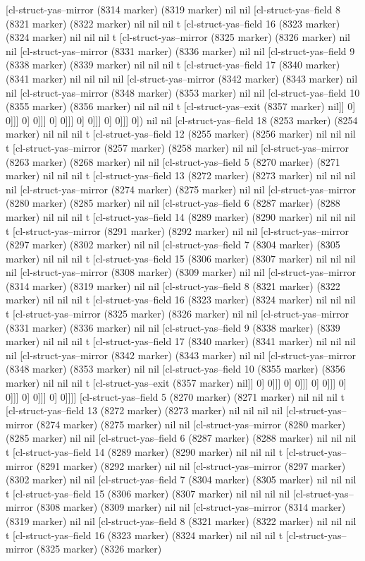 {{[cl-struct-yas--mirror (8314 marker) (8319 marker) nil nil [cl-struct-yas--field 8 (8321 marker) (8322 marker) nil nil nil t [cl-struct-yas--field 16 (8323 marker) (8324 marker) nil nil nil t [cl-struct-yas--mirror (8325 marker) (8326 marker) nil nil [cl-struct-yas--mirror (8331 marker) (8336 marker) nil nil [cl-struct-yas--field 9 (8338 marker) (8339 marker) nil nil nil t [cl-struct-yas--field 17 (8340 marker) (8341 marker) nil nil nil nil [cl-struct-yas--mirror (8342 marker) (8343 marker) nil nil [cl-struct-yas--mirror (8348 marker) (8353 marker) nil nil [cl-struct-yas--field 10 (8355 marker) (8356 marker) nil nil nil t [cl-struct-yas--exit (8357 marker) nil]] 0] 0]]] 0] 0]]] 0] 0]]] 0] 0]]] 0] 0]]] 0]) nil nil [cl-struct-yas--field 18 (8253 marker) (8254 marker) nil nil nil t [cl-struct-yas--field 12 (8255 marker) (8256 marker) nil nil nil t [cl-struct-yas--mirror (8257 marker) (8258 marker) nil nil [cl-struct-yas--mirror (8263 marker) (8268 marker) nil nil [cl-struct-yas--field 5 (8270 marker) (8271 marker) nil nil nil t [cl-struct-yas--field 13 (8272 marker) (8273 marker) nil nil nil nil [cl-struct-yas--mirror (8274 marker) (8275 marker) nil nil [cl-struct-yas--mirror (8280 marker) (8285 marker) nil nil [cl-struct-yas--field 6 (8287 marker) (8288 marker) nil nil nil t [cl-struct-yas--field 14 (8289 marker) (8290 marker) nil nil nil t [cl-struct-yas--mirror (8291 marker) (8292 marker) nil nil [cl-struct-yas--mirror (8297 marker) (8302 marker) nil nil [cl-struct-yas--field 7 (8304 marker) (8305 marker) nil nil nil t [cl-struct-yas--field 15 (8306 marker) (8307 marker) nil nil nil nil [cl-struct-yas--mirror (8308 marker) (8309 marker) nil nil [cl-struct-yas--mirror (8314 marker) (8319 marker) nil nil [cl-struct-yas--field 8 (8321 marker) (8322 marker) nil nil nil t [cl-struct-yas--field 16 (8323 marker) (8324 marker) nil nil nil t [cl-struct-yas--mirror (8325 marker) (8326 marker) nil nil [cl-struct-yas--mirror (8331 marker) (8336 marker) nil nil [cl-struct-yas--field 9 (8338 marker) (8339 marker) nil nil nil t [cl-struct-yas--field 17 (8340 marker) (8341 marker) nil nil nil nil [cl-struct-yas--mirror (8342 marker) (8343 marker) nil nil [cl-struct-yas--mirror (8348 marker) (8353 marker) nil nil [cl-struct-yas--field 10 (8355 marker) (8356 marker) nil nil nil t [cl-struct-yas--exit (8357 marker) nil]] 0] 0]]] 0] 0]]] 0] 0]]] 0] 0]]] 0] 0]]] 0] 0]]]] [cl-struct-yas--field 5 (8270 marker) (8271 marker) nil nil nil t [cl-struct-yas--field 13 (8272 marker) (8273 marker) nil nil nil nil [cl-struct-yas--mirror (8274 marker) (8275 marker) nil nil [cl-struct-yas--mirror (8280 marker) (8285 marker) nil nil [cl-struct-yas--field 6 (8287 marker) (8288 marker) nil nil nil t [cl-struct-yas--field 14 (8289 marker) (8290 marker) nil nil nil t [cl-struct-yas--mirror (8291 marker) (8292 marker) nil nil [cl-struct-yas--mirror (8297 marker) (8302 marker) nil nil [cl-struct-yas--field 7 (8304 marker) (8305 marker) nil nil nil t [cl-struct-yas--field 15 (8306 marker) (8307 marker) nil nil nil nil [cl-struct-yas--mirror (8308 marker) (8309 marker) nil nil [cl-struct-yas--mirror (8314 marker) (8319 marker) nil nil [cl-struct-yas--field 8 (8321 marker) (8322 marker) nil nil nil t [cl-struct-yas--field 16 (8323 marker) (8324 marker) nil nil nil t [cl-struct-yas--mirror (8325 marker) (8326 marker) }}
